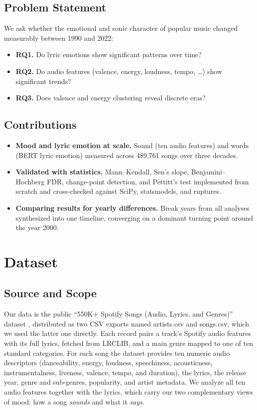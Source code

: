 \documentclass[conference]{IEEEtran}
\begin{document}
\subsection{Problem Statement}
We ask whether the emotional and sonic character of popular music changed
measurably between 1990 and 2022:

\begin{itemize}
  \item \textbf{RQ1.} Do lyric emotions show significant patterns over time?
  \item \textbf{RQ2.} Do audio features (valence, energy, loudness, tempo,
        \dots) show significant trends?
  \item \textbf{RQ3.} Does valence and energy clustering reveal discrete eras?
\end{itemize}


\subsection{Contributions}
\begin{itemize}
  \item \textbf{Mood and lyric emotion at scale.} Sound (ten audio features) and
        words (BERT lyric emotion) measured across 489{,}761 songs over
        three decades.
  \item \textbf{Validated with statistics.} Mann--Kendall, Sen's slope,
        Benjamini--Hochberg FDR, change-point detection, and Pettitt's test
        implemented from scratch and cross-checked against SciPy, statsmodels,
        and ruptures.
  \item \textbf{Comparing results for yearly differences.} Break years from all analyses
        synthesized into one timeline, converging on a dominant turning point
        around the year 2000.
\end{itemize}

\section{Dataset}
\label{sec:dataset}

\subsection{Source and Scope}
Our data is the public ``550K+ Spotify Songs (Audio, Lyrics, and Genres)''
dataset \cite{b_dataset}, distributed as two CSV exports named artists.csv and songs.csv, 
which we used the latter one directly. Each record pairs a track's Spotify audio features with its full
lyrics, fetched from LRCLIB, and a main genre mapped to one of ten standard
categories. For each song the dataset provides ten numeric audio descriptors
(danceability, energy, loudness, speechiness, acousticness, instrumentalness,
liveness, valence, tempo, and duration), the lyrics, the release year, genre and
sub-genres, popularity, and artist metadata. We analyze all ten audio features
together with the lyrics, which carry our two complementary views of mood:
how a song \emph{sounds} and what it \emph{says}.
\end{document}
